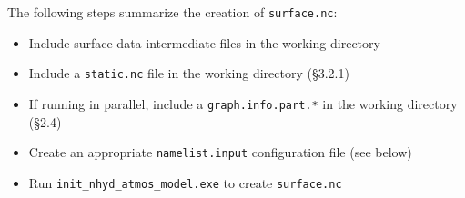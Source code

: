 \documentclass[11pt]{report}
\begin{document}
The following steps summarize the creation of {\tt surface.nc}:

\begin{itemize}
\item Include surface data intermediate files in the working directory
\item Include a {\tt static.nc} file in the working directory (\S 3.2.1)
\item If running in parallel, include a {\tt graph.info.part.*} in the working directory (\S 2.4)
\item Create an appropriate {\tt namelist.input} configuration file (see below)
\item Run {\tt init\_nhyd\_atmos\_model.exe} to create {\tt surface.nc}
\end{itemize}


\begin{longtable}{p{3.0in} |p{3.25in}}


\end{longtable}
\end{document}
